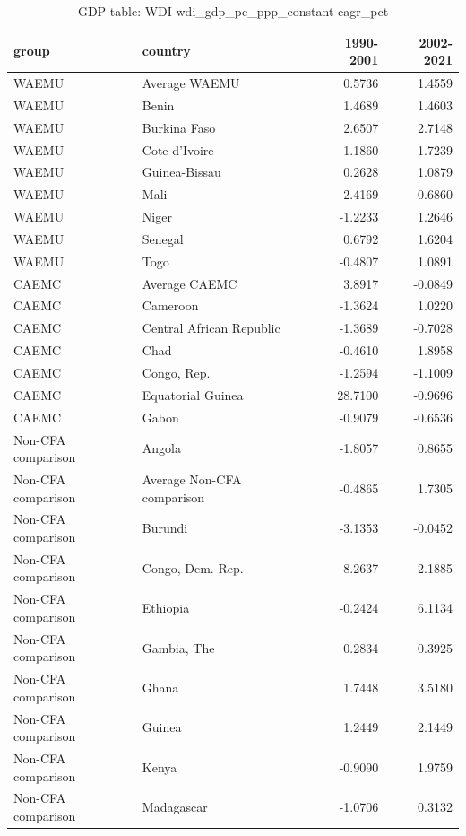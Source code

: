 \begin{table}

\caption{GDP table: WDI wdi_gdp_pc_ppp_constant cagr_pct}
\centering
\begin{tabular}[t]{llrr}
\toprule
group & country & 1990-2001 & 2002-2021\\
\midrule
WAEMU & Average WAEMU & 0.5736 & 1.4559\\
WAEMU & Benin & 1.4689 & 1.4603\\
WAEMU & Burkina Faso & 2.6507 & 2.7148\\
WAEMU & Cote d'Ivoire & -1.1860 & 1.7239\\
WAEMU & Guinea-Bissau & 0.2628 & 1.0879\\
\addlinespace
WAEMU & Mali & 2.4169 & 0.6860\\
WAEMU & Niger & -1.2233 & 1.2646\\
WAEMU & Senegal & 0.6792 & 1.6204\\
WAEMU & Togo & -0.4807 & 1.0891\\
CAEMC & Average CAEMC & 3.8917 & -0.0849\\
\addlinespace
CAEMC & Cameroon & -1.3624 & 1.0220\\
CAEMC & Central African Republic & -1.3689 & -0.7028\\
CAEMC & Chad & -0.4610 & 1.8958\\
CAEMC & Congo, Rep. & -1.2594 & -1.1009\\
CAEMC & Equatorial Guinea & 28.7100 & -0.9696\\
\addlinespace
CAEMC & Gabon & -0.9079 & -0.6536\\
Non-CFA comparison & Angola & -1.8057 & 0.8655\\
Non-CFA comparison & Average Non-CFA comparison & -0.4865 & 1.7305\\
Non-CFA comparison & Burundi & -3.1353 & -0.0452\\
Non-CFA comparison & Congo, Dem. Rep. & -8.2637 & 2.1885\\
\addlinespace
Non-CFA comparison & Ethiopia & -0.2424 & 6.1134\\
Non-CFA comparison & Gambia, The & 0.2834 & 0.3925\\
Non-CFA comparison & Ghana & 1.7448 & 3.5180\\
Non-CFA comparison & Guinea & 1.2449 & 2.1449\\
Non-CFA comparison & Kenya & -0.9090 & 1.9759\\
\addlinespace
Non-CFA comparison & Madagascar & -1.0706 & 0.3132\\

\end{tabular}
\end{table}
